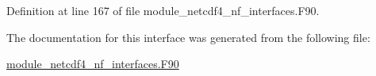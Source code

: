 Definition at line 167 of file module\+\_\+netcdf4\+\_\+nf\+\_\+interfaces.\+F90.



The documentation for this interface was generated from the following file\+:\begin{DoxyCompactItemize}
\item 
\hyperlink{module__netcdf4__nf__interfaces_8F90}{module\+\_\+netcdf4\+\_\+nf\+\_\+interfaces.\+F90}\end{DoxyCompactItemize}
